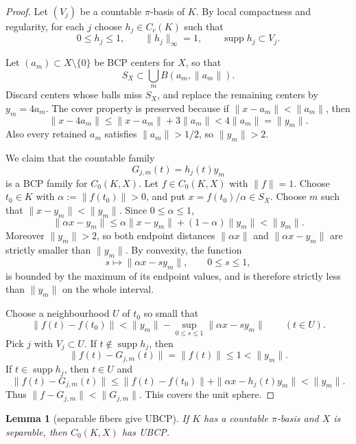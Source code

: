 \documentclass[11pt]{article}
\newtheorem{lemma}{Lemma}
\newcommand{\supp}{\operatorname{supp}}
\begin{document}
\begin{proof}
Let \((V_j)\) be a countable \(\pi\)-basis of \(K\).  By local compactness and
regularity, for each \(j\) choose \(h_j\in C_c(K)\) such that
\[
        0\le h_j\le1,\qquad \|h_j\|_\infty=1,\qquad \supp h_j\subset V_j .
\]

Let \((a_m)\subset X\setminus\{0\}\) be BCP centers for \(X\), so that
\[
        S_X\subset \bigcup_m B(a_m,\|a_m\|).
\]
Discard centers whose balls miss \(S_X\), and replace the remaining centers by
\(y_m=4a_m\).  The cover property is preserved because if
\(\|x-a_m\|<\|a_m\|\), then
\[
        \|x-4a_m\|
        \le \|x-a_m\|+3\|a_m\|
        <4\|a_m\|=\|y_m\|.
\]
Also every retained \(a_m\) satisfies \(\|a_m\|>1/2\), so \(\|y_m\|>2\).

We claim that the countable family
\[
        G_{j,m}(t)=h_j(t)y_m
\]
is a BCP family for \(C_0(K,X)\).  Let \(f\in C_0(K,X)\) with \(\|f\|=1\).
Choose \(t_0\in K\) with \(\alpha:=\|f(t_0)\|>0\), and put
\(x=f(t_0)/\alpha\in S_X\).  Choose \(m\) such that
\(\|x-y_m\|<\|y_m\|\).  Since \(0\le\alpha\le1\),
\[
        \|\alpha x-y_m\|
        \le \alpha\|x-y_m\|+(1-\alpha)\|y_m\|
        <\|y_m\|.
\]
Moreover \(\|y_m\|>2\), so both endpoint distances
\(\|\alpha x\|\) and \(\|\alpha x-y_m\|\) are strictly smaller than
\(\|y_m\|\).  By convexity, the function
\[
        s\mapsto \|\alpha x-sy_m\|,\qquad 0\le s\le1,
\]
is bounded by the maximum of its endpoint values, and is therefore strictly
less than \(\|y_m\|\) on the whole interval.

Choose a neighbourhood \(U\) of \(t_0\) so small that
\[
        \|f(t)-f(t_0)\|
        <
        \|y_m\|-\sup_{0\le s\le1}\|\alpha x-sy_m\|
        \qquad(t\in U).
\]
Pick \(j\) with \(V_j\subset U\).  If \(t\notin\supp h_j\), then
\[
        \|f(t)-G_{j,m}(t)\|=\|f(t)\|\le1<\|y_m\|.
\]
If \(t\in\supp h_j\), then \(t\in U\) and
\[
        \|f(t)-G_{j,m}(t)\|
        \le
        \|f(t)-f(t_0)\|+\|\alpha x-h_j(t)y_m\|
        < \|y_m\|.
\]
Thus \(\|f-G_{j,m}\|<\|G_{j,m}\|\).  This covers the unit sphere.
\end{proof}

\begin{lemma}[separable fibers give UBCP]
\label{lem:separable-ubcp}
If \(K\) has a countable \(\pi\)-basis and \(X\) is separable, then
\(C_0(K,X)\) has UBCP.
\end{lemma}
\end{document}
